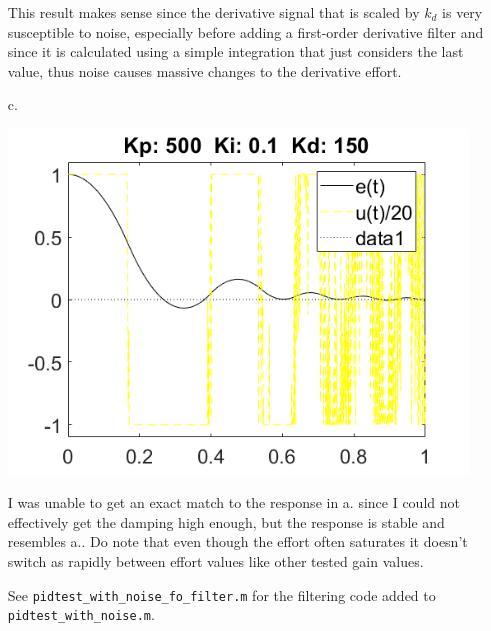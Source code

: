 \documentclass[12pt]{article}
\begin{document}
\begin{enumerate}
    This result makes sense since the derivative signal that is scaled by $k_d$ is very susceptible to noise, especially before adding a first-order derivative filter and since it is calculated using a simple integration that just considers the last value, thus noise causes massive changes to the derivative effort.

    \item[c.] 

    \includegraphics[width=4.8in]{23c.png}

    I was unable to get an exact match to the response in a. since I could not effectively get the damping high enough, but the response is stable and resembles a.. Do note that even though the effort often saturates it doesn't switch as rapidly between effort values like other tested gain values.

    See \verb|pidtest_with_noise_fo_filter.m| for the filtering code added to \verb|pidtest_with_noise.m|.
\end{enumerate}
\end{document}
